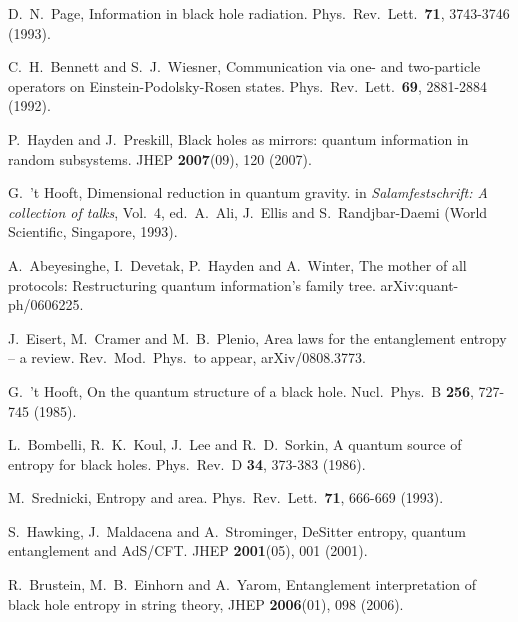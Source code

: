 \documentclass[aps,prl,amsmath,amssymb,floatfix,12pt]{revtex4}
\begin{document}
\begin{thebibliography}{18}

 D.\ N.\ Page,
Information in black hole radiation.
Phys.\ Rev.\ Lett.\ {\bf 71}, 3743-3746 (1993).

 C.\ H.\ Bennett and S.\ J.\ Wiesner,
Communication via one- and two-particle operators on
Einstein-Podolsky-Rosen states.
Phys.\ Rev.\ Lett.\ {\bf 69}, 2881-2884 (1992).

 P.\ Hayden and J.\ Preskill,
Black holes as mirrors: quantum information in random subsystems.
JHEP {\bf 2007}(09), 120 (2007).

 G.\ 't Hooft,
Dimensional reduction in quantum gravity.
in {\it Salamfestschrift: A collection of talks}, 
Vol.\ 4, ed.\ A.\ Ali, J.\ Ellis and S.\ Randjbar-Daemi
(World Scientific, Singapore, 1993).

 A.\ Abeyesinghe, I.\ Devetak, P.\ Hayden and A.\ Winter,
The mother of all protocols: Restructuring quantum information's family
tree.
arXiv:quant-ph/0606225.

 J.\ Eisert, M.\ Cramer and M.\ B.\ Plenio,
Area laws for the entanglement entropy -- a review.
Rev.\ Mod.\ Phys.\ to appear, arXiv/0808.3773.



 G.\ 't Hooft,
On the quantum structure of a black hole.
Nucl.\ Phys.\ B {\bf 256}, 727-745 (1985).

 L.\ Bombelli, R.\ K.\ Koul, J.\ Lee and R.\ D.\ Sorkin,
A quantum source of entropy for black holes.
Phys.\ Rev.\ D {\bf 34}, 373-383 (1986).

 M.\ Srednicki,
Entropy and area.
Phys.\ Rev.\ Lett.\ {\bf 71}, 666-669 (1993).

 S.\ Hawking, J.\ Maldacena and A.\ Strominger,
DeSitter entropy, quantum entanglement and AdS/CFT.
JHEP {\bf 2001}(05), 001 (2001).

 R.\ Brustein, M.\ B.\ Einhorn and A.\ Yarom,
Entanglement interpretation of black hole entropy in string theory,
JHEP {\bf 2006}(01), 098 (2006).


\end{thebibliography}
\end{document}
